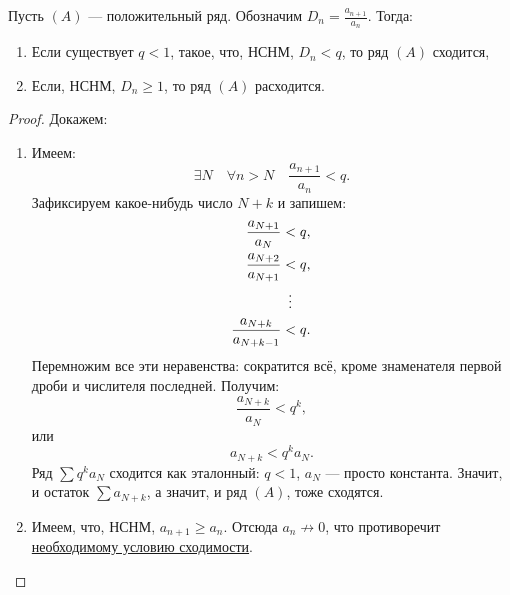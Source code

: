 \begin{theorem}[noob] \hypertarget{Даламбер-нуб}{}
	Пусть \((A)\) --- положительный ряд. Обозначим \(D_n = \frac{a_{n+1}}{a_n}\). Тогда:
	\begin{enumerate}
		\item Если существует \(q < 1\), такое, что, НСНМ, \(D_n < q\), то ряд \((A)\) сходится,
		\item Если, НСНМ, \(D_n \geqslant 1\), то ряд \((A)\) расходится. 
	\end{enumerate}
\end{theorem}
\begin{proof}
	Докажем:
	\begin{enumerate}
		\item Имеем: \[
		\exists N \quad \forall n > N \quad \frac{a_{n+1}}{a_n} < q.
		\]
		Зафиксируем какое-нибудь число \(N + k\) и запишем:
		\begin{align*}
			\frac{a_{N+1}}{a_N} 	  &< q, 		   \\
			\frac{a_{N+2}}{a_{N+1}}   &< q, 		   \\
			& \enskip \vdots \\
			\frac{a_{N+k}}{a_{N+k-1}} &<q. 			   \\
		\end{align*}
		Перемножим все эти неравенства: сократится всё, кроме знаменателя первой дроби и числителя последней. Получим: \[
		\frac{a_{N+k}}{a_N} < q^k,
		\]
		или \[
		a_{N+k} < q^k a_N.
		\]
		Ряд \(\sum q^k a_N\) сходится как эталонный: \(q < 1\), \(a_N\) --- просто константа. Значит, и остаток \(\sum a_{N+k}\), а значит, и ряд \((A)\), тоже сходятся.
		\item Имеем, что, НСНМ, \(a_{n+1} \geqslant a_n\). Отсюда \(a_n \not\to 0\), что противоречит \hyperlink{необходимое условие сходимости}{необходимому условию сходимости}.
	\end{enumerate}
\end{proof}

